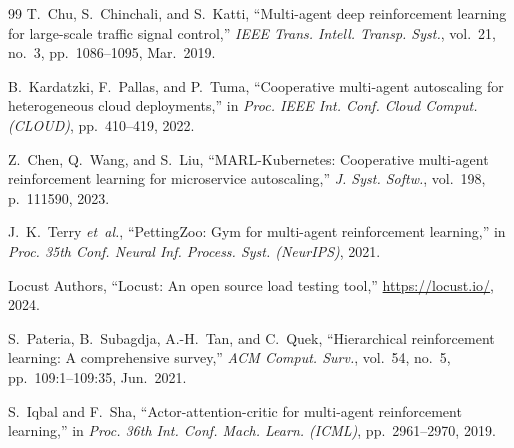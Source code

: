 \documentclass[conference]{IEEEtran}
\begin{document}
\begin{thebibliography}{99}
T.~Chu, S.~Chinchali, and S.~Katti,
``Multi-agent deep reinforcement learning for large-scale traffic
signal control,''
\textit{IEEE Trans. Intell. Transp. Syst.},
vol.~21, no.~3, pp.~1086--1095, Mar.~2019.

B.~Kardatzki, F.~Pallas, and P.~Tuma,
``Cooperative multi-agent autoscaling for heterogeneous cloud
deployments,''
in \textit{Proc. IEEE Int. Conf. Cloud Comput. (CLOUD)},
pp.~410--419, 2022.

Z.~Chen, Q.~Wang, and S.~Liu,
``MARL-Kubernetes: Cooperative multi-agent reinforcement learning
for microservice autoscaling,''
\textit{J. Syst. Softw.}, vol.~198, p.~111590, 2023.

J.~K.~Terry \textit{et~al.},
``PettingZoo: Gym for multi-agent reinforcement learning,''
in \textit{Proc. 35th Conf. Neural Inf. Process. Syst. (NeurIPS)},
2021.

Locust Authors,
``Locust: An open source load testing tool,''
\url{https://locust.io/}, 2024.

S.~Pateria, B.~Subagdja, A.-H.~Tan, and C.~Quek,
``Hierarchical reinforcement learning: A comprehensive survey,''
\textit{ACM Comput. Surv.}, vol.~54, no.~5,
pp.~109:1--109:35, Jun.~2021.

S.~Iqbal and F.~Sha,
``Actor-attention-critic for multi-agent reinforcement learning,''
in \textit{Proc. 36th Int. Conf. Mach. Learn. (ICML)},
pp.~2961--2970, 2019.

\end{thebibliography}
\end{document}

